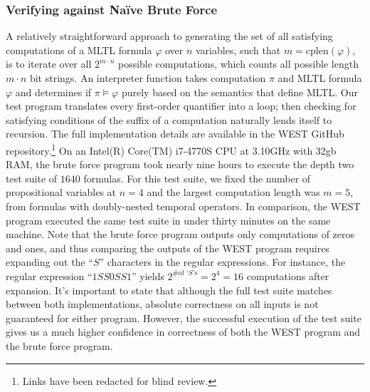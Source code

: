 \documentclass[runningheads]{llncs}
\renewcommand{\phi}{\varphi}
\begin{document}
\subsubsection{Verifying against Na\"ive Brute Force}
A relatively straightforward approach to generating the set of all satisfying computations of a MLTL formula $\phi$ over $n$ variables, such that $m = \text{cplen}(\phi)$, is to iterate over all $2^{m \cdot n}$ possible computations, which counts all possible length $m \cdot n$ bit strings. 
An interpreter function takes computation $\pi$ and MLTL formula $\phi$ and determines if $\pi \vDash \phi$ purely based on the semantics that define MLTL.
Our test program translates every first-order quantifier into a loop; then checking for satisfying conditions of the suffix of a computation naturally lends itself to recursion.
The full implementation details are available in the WEST GitHub repository.\footnote{Links have been redacted for blind review.} 
On an Intel(R) Core(TM) i7-4770S CPU at 3.10GHz with 32gb RAM, the brute force program took nearly nine hours to execute the depth two test suite of $1640$ formulas. 
For this test suite, we fixed the number of propositional variables at $n = 4$ and the largest computation length was $m = 5$, from formulas with doubly-nested temporal operators. 
In comparison, the WEST program executed the same test suite in under thirty minutes on the same machine. Note that the brute force program outputs only computations of zeros and ones, and thus comparing the outputs of the WEST program requires expanding out the ``$S$'' characters in the regular expressions. For instance, the regular expression ``$1SS0SS1$'' yields $2^{\text{\# of `$S$'s}} = 2^4 = 16$ computations after expansion.
It's important to state that although the full test suite matches between both implementations, absolute correctness on all inputs is not guaranteed for either program. However, the successful execution of the test suite gives us a much higher confidence in correctness of both the WEST program and the brute force program. 
\end{document}
